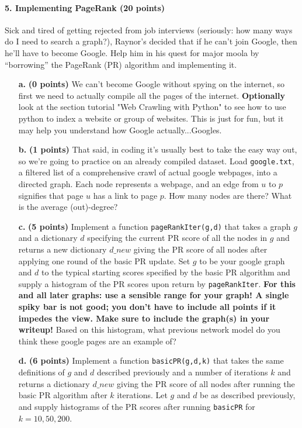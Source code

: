 \documentclass[11pt]{article}
\newcommand{\code}[1]{\texttt{#1}}
\begin{document}
\paragraph{5. Implementing PageRank (20 points)}
Sick and tired of getting rejected from job interviews (seriously: how many ways do I need to search a graph?), Raynor's decided that if he can't join Google, then he'll have to become Google. Help him in his quest for major moola by ``borrowing'' the PageRank (PR) algorithm and implementing it.
\begin{itemize}
    \item[\textbf{a. }] \textbf{(0 points)} We can't become Google without spying on the internet, so first we need to actually compile all the pages of the internet. \textbf{Optionally} look at the section tutorial "Web Crawling with Python" to see how to use python to index a website or group of websites. This is just for fun, but it may help you understand how Google actually...Googles.
    \item[\textbf{b. }] \textbf{(1 points)} That said, in coding it's usually best to take the easy way out, so we're going to practice on an already compiled dataset. Load \code{google.txt}, a filtered list of a comprehensive crawl of actual google webpages, into a directed graph. Each node represents a webpage, and an edge from $u$ to $p$ signifies that page $u$ has a link to page $p$. How many nodes are there? What is the average (out)-degree?
    \item[\textbf{c. }] \textbf{(5 points)} Implement a function \code{pageRankIter(g,d)} that takes a graph $g$ and a dictionary $d$ specifying the current PR score of all the nodes in $g$ and returns a new dictionary $d\_new$ giving the PR score of all nodes after applying one round of the basic PR update. Set $g$ to be your google graph and $d$ to the typical starting scores specified by the basic PR algorithm and supply a histogram of the PR scores upon return by \code{pageRankIter}. \textbf{For this and all later graphs: use a sensible range for your graph! A single spiky bar is not good; you don't have to include all points if it impedes the view. Make sure to include the graph(s) in your writeup!} Based on this histogram, what previous network model do you think these google pages are an example of?
    \item[\textbf{d. }] \textbf{(6 points)} Implement a function \code{basicPR(g,d,k)} that takes the same definitions of $g$ and $d$ described previously and a number of iterations $k$ and returns a dictionary $d\_new$ giving the PR score of all nodes after running the basic PR algorithm after $k$ iterations. Let $g$ and $d$ be as described previously, and supply histograms of the PR scores after running \code{basicPR} for $k = 10, 50, 200$.

\end{itemize}
\end{document}
